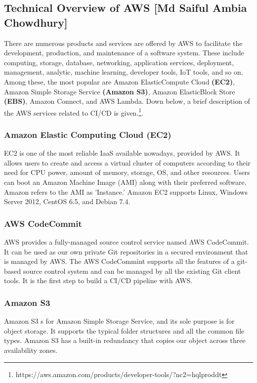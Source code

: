 
%
\subsection{Technical Overview of AWS [Md Saiful Ambia Chowdhury]}
%
There are numerous products and services are offered by AWS to facilitate the development, production, and maintenance of a software system. These include computing, storage, database, networking, application services, deployment, management, analytic, machine learning, developer tools, IoT tools, and so on. Among these, the most popular are Amazon ElasticCompute Cloud \textbf{(EC2)}, Amazon Simple Storage Service \textbf{(Amazon S3)}, Amazon ElasticBlock Store \textbf{(EBS)}, Amazon Connect, and AWS Lambda. Down below, a brief description of the AWS services related to CI/CD is given.\footnote{https://aws.amazon.com/products/developer-tools/?nc2=h\textunderscore ql\textunderscore prod\textunderscore dt}.

\subsubsection{Amazon Elastic Computing Cloud (EC2)}
%
EC2 is one of the most reliable IaaS available nowadays, provided by AWS. It allows users to create and access a virtual cluster of computers according to their need for CPU power, amount of memory, storage, OS, and other resources. Users can boot an Amazon Machine Image (AMI) along with their preferred software. Amazon refers to the AMI as 'Instance.' Amazon EC2 supports Linux, Windows Server 2012, CentOS 6.5, and Debian 7.4.
%

\subsubsection{AWS CodeCommit}
%
AWS provides a fully-managed source control service named AWS CodeCommit. It can be used as our own private Git repositories in a secured environment that is managed by AWS. The AWS CodeCommint supports all the features of a git-based source control system and can be managed by all the existing Git client tools. It is the first step to build a CI/CD pipeline with AWS.  
%

\subsubsection{Amazon S3}
%
Amazon S3 s for Amazon Simple Storage Service, and its sole purpose is for object storage. It supports the typical folder structures and all the common file types. Amazon S3 has a built-in redundancy that copies our object across three availability zones.
%

